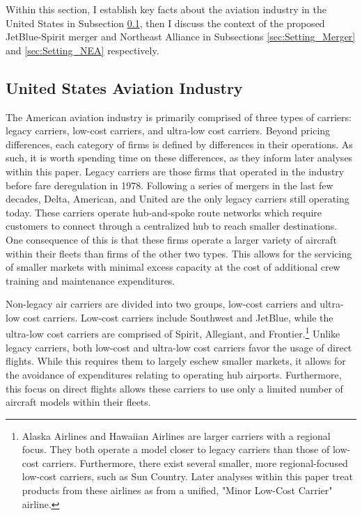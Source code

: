 \documentclass{article}
\begin{document}
	Within this section, I establish key facts about the aviation industry in the United States in Subsection \ref{sec:Setting_Aviation}, then I discuss the context of the proposed JetBlue-Spirit merger and Northeast Alliance in Subsections  \ref{sec:Setting_Merger} and \ref{sec:Setting_NEA} respectively.
	
	\subsection{United States Aviation Industry}
	\label{sec:Setting_Aviation}
	The American aviation industry is primarily comprised of three types of carriers: legacy carriers, low-cost carriers, and ultra-low cost carriers. Beyond pricing differences, each category of firms is defined by differences in their operations. As such, it is worth spending time on these differences, as they inform later analyses within this paper. 	
	Legacy carriers are those firms that operated in the industry before fare deregulation in 1978. Following a series of mergers in the last few decades, Delta, American, and United are the only legacy carriers still operating today. These carriers operate hub-and-spoke route networks which require customers to connect through a centralized hub to reach smaller destinations. One consequence of this is that these firms operate a larger variety of aircraft within their fleets than firms of the other two types. This allows for the servicing of smaller markets with minimal excess capacity at the cost of additional crew training and maintenance expenditures.   
	
	Non-legacy air carriers are divided into two groups, low-cost carriers and ultra-low cost carriers. Low-cost carriers include Southwest and JetBlue, while the ultra-low cost carriers are comprised of Spirit, Allegiant, and Frontier.\footnote{Alaska Airlines and Hawaiian Airlines are larger carriers with a regional focus. They both operate a model closer to legacy carriers than those of low-cost carriers. Furthermore, there exist several smaller, more regional-focused low-cost carriers, such as Sun Country. Later analyses within this paper treat products from these airlines as from a unified, "Minor Low-Cost Carrier" airline.} Unlike legacy carriers, both low-cost and ultra-low cost carriers favor the usage of direct flights. While this requires them to largely eschew smaller markets, it allows for the avoidance of expenditures relating to operating hub airports. Furthermore, this focus on direct flights allows these carriers to use only a limited number of aircraft models within their fleets.
\end{document}
